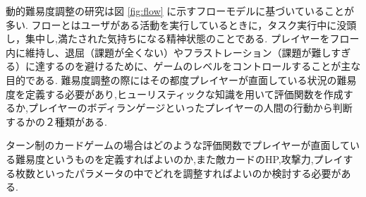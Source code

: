 \documentclass{jarticle}     %
\begin{document}
動的難易度調整の研究は図 \ref{fig:flow} に示すフローモデルに基づいていることが多い.
フローとはユーザがある活動を実行しているときに，タスク実行中に没頭し，集中し,満たされた気持ちになる精神状態のことである.
プレイヤーをフロー内に維持し、退屈（課題が全くない）やフラストレーション（課題が難しすぎる）に達するのを避けるために、ゲームのレベルをコントロールすることが主な目的である\cite{DDA}.
難易度調整の際にはその都度プレイヤーが直面している状況の難易度を定義する必要があり,ヒューリスティックな知識を用いて評価関数を作成するか,プレイヤーのボディランゲージといったプレイヤーの人間の行動から判断するかの２種類がある\cite{DDA}.

ターン制のカードゲームの場合はどのような評価関数でプレイヤーが直面している難易度というものを定義すればよいのか,また敵カードのHP,攻撃力,プレイする枚数といったパラメータの中でどれを調整すればよいのか検討する必要がある.




\end{document}
